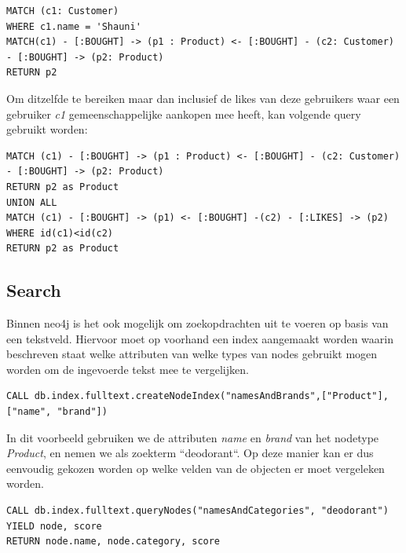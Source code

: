 \begin{lstlisting}[caption={Neo4j query die de aankopen van gebruikers weergeeft waar een gebruiker c1 gemeenschappelijke aankopen mee heeft}]
MATCH (c1: Customer)
WHERE c1.name = 'Shauni'
MATCH(c1) - [:BOUGHT] -> (p1 : Product) <- [:BOUGHT] - (c2: Customer) - [:BOUGHT] -> (p2: Product)
RETURN p2
\end{lstlisting}

Om ditzelfde te bereiken maar dan inclusief de likes van deze gebruikers waar een gebruiker \textit{c1} gemeenschappelijke aankopen mee heeft, kan volgende query gebruikt worden: 

\begin{lstlisting}[caption={Neo4j query die de aankopen en likes van gebruikers weergeeft waar een gebruiker c1 gemeenschappelijke aankopen mee heeft}]
MATCH (c1) - [:BOUGHT] -> (p1 : Product) <- [:BOUGHT] - (c2: Customer) - [:BOUGHT] -> (p2: Product)
RETURN p2 as Product
UNION ALL
MATCH (c1) - [:BOUGHT] -> (p1) <- [:BOUGHT] -(c2) - [:LIKES] -> (p2) 
WHERE id(c1)<id(c2)
RETURN p2 as Product
\end{lstlisting}


\subsection{Search}
\label{subsec: Search Neo4j}

Binnen neo4j is het ook mogelijk om zoekopdrachten uit te voeren op basis van een tekstveld. Hiervoor moet op voorhand een index aangemaakt worden waarin beschreven staat welke attributen van welke types van nodes gebruikt mogen worden om de ingevoerde tekst mee te vergelijken.

\begin{lstlisting}[caption={Een index creëren binnen Neo4j om zoekopdrachten op basis van tekst uit te voeren}]
CALL db.index.fulltext.createNodeIndex("namesAndBrands",["Product"],["name", "brand"])
\end{lstlisting}

In dit voorbeeld gebruiken we de attributen \textit{name} en \textit{brand} van het nodetype \textit{Product}, en nemen we als zoekterm ``deodorant``.  Op deze manier kan er dus eenvoudig gekozen worden op welke velden van de objecten er moet vergeleken worden.



\begin{lstlisting}[caption={Een zoekopdracht uitvoeren op basis van tekst}]
CALL db.index.fulltext.queryNodes("namesAndCategories", "deodorant") YIELD node, score
RETURN node.name, node.category, score
\end{lstlisting}


